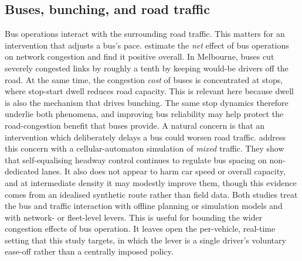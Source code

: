 \documentclass[11pt,a4paper]{article}
\begin{document}
\subsection{Buses, bunching, and road traffic}
\label{sec:rw-traffic}
Bus operations interact with the surrounding road traffic. This matters for an intervention that
adjusts a bus's pace. \citet{NguyenPhuoc2018} estimate the \emph{net} effect of bus operations on
network congestion and find it positive overall. In Melbourne, buses cut severely congested links by
roughly a tenth by keeping would-be drivers off the road. At the same time, the congestion \emph{cost}
of buses is concentrated at stops, where stop-start dwell reduces road capacity. This is relevant here
because dwell is also the mechanism that drives bunching. The same stop dynamics therefore underlie
both phenomena, and improving bus reliability may help protect the road-congestion benefit that buses
provide. A natural concern is that an intervention which deliberately delays a bus could worsen road
traffic. \citet{Qiang2023} address this concern with a cellular-automaton simulation of \emph{mixed}
traffic. They show that self-equalising headway control continues to regulate bus spacing on
non-dedicated lanes. It also does not appear to harm car speed or overall capacity, and at
intermediate density it may modestly improve them, though this evidence comes from an idealised
synthetic route rather than field data. Both studies treat the bus and traffic interaction with
offline planning or simulation models and with network- or fleet-level levers. This is useful for
bounding the wider congestion effects of bus operation. It leaves open the per-vehicle, real-time
setting that this study targets, in which the lever is a single driver's voluntary ease-off rather
than a centrally imposed policy.
\end{document}

